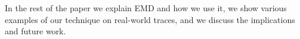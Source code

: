 In the rest of the paper we explain EMD and how we use it, we show various examples of our technique on real-world
traces, and we discuss the implications and future work.










